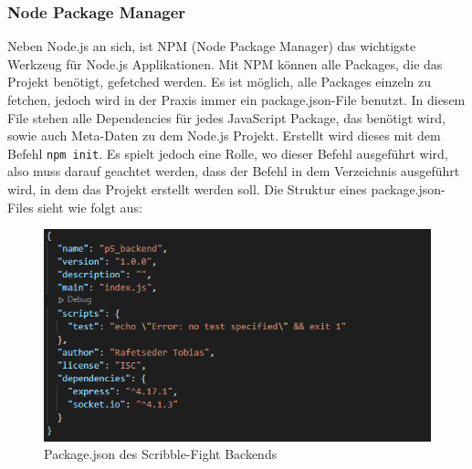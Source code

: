 


\subsubsection{Node Package Manager}\label{NPM}
Neben Node.js an sich, ist NPM (Node Package Manager) das wichtigste Werkzeug für Node.js Applikationen. Mit NPM können alle Packages, die das Projekt benötigt, gefetched werden.
Es ist möglich, alle Packages einzeln zu fetchen, jedoch wird in der Praxis immer ein package.json-File benutzt. In diesem File stehen alle Dependencies für jedes JavaScript Package,
das benötigt wird, sowie auch Meta-Daten zu dem Node.js Projekt.
Erstellt wird dieses mit dem Befehl \texttt{npm init}. Es spielt jedoch eine Rolle, wo dieser Befehl ausgeführt wird, also muss darauf geachtet werden, dass der Befehl in dem Verzeichnis ausgeführt wird, in dem das Projekt erstellt werden soll.
Die Struktur eines package.json-Files sieht wie folgt aus:
\begin{figure}[H]
    \centering
    \includegraphics[scale=1]{pics/package json.PNG}
    \caption{Package.json des Scribble-Fight Backends}
\end{figure}

